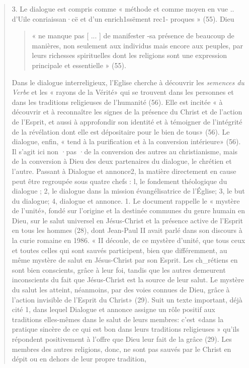 \begin{quote}
3. Le dialogue est compris comme « méthode et comme
moyen en vue .. d'Uile conriaissan·cë et d'un enrich1ssëment rec1-
proques » (55). Dieu 
\begin{quote}
    « ne manque pas [ ... ] de manifester -sa
présence de beaucoup de manières, non seulement aux individus
mais encore aux peuples, par leurs richesses spirituelles
dont les religions sont une expression principale et essentielle
» (55).
\end{quote}
 Dans le dialogue interreligieux, l'Eglise cherche
à découvrir les \textit{ semences du Verbe} et les « rayons de la
Vérité» qui se trouvent dans les personnes et dans les traditions
religieuses de l'humanité (56). Elle est incitée « à découvrir
et à reconnaître les signes de la présence du Christ et de
l'action de l'Esprit, et aussi à approfondir son identité et à
témoigner de l'intégrité de la révélation dont elle est dépositaire
pour le bien de tous» (56). Le dialogue, enfin, « tend à la
purification et à la conversion intérieure» (56). Il s'agit ici non
·pas ·de la conversion des autres au christianisme, mais de la
conversion à Dieu des deux partenaires du dialogue, le chrétien
et l'autre.
Passant à Dialogue et annonce2, la matière directement en
cause peut être regroupée sous quatre chefs : l, le fondement 
théologique du dialogue ; 2, le dialogue dans la mission évangélisatrice
de l'Église; 3, le but du dialogue; 4, dialogue et
annonce.
1. Le document rappelle le « mystère de l'unité», fondé sur
l'origine et la destinée communes du genre humain en Dieu,
sur le salut universel en Jésus-Christ et la présence active de
l'Esprit en tous les hommes (28), dont Jean-Paul II avait parlé
dans son discours à la curie romaine en 1986. « II découle, de
ce mystère d'unité, que tous ceux et toutes celles qui sont sauvés
participent, bien que différemment, au même mystère de
salut en Jésus-Christ par son Esprit. Les ch_rétiens en sont bien
conscients, grâce à leur foi, tandis que les autres demeurent
inconscients du fait que Jésus-Christ est la source de leur salut.
Le mystère du salut les atteint, néanmoins, par des voies
connues de Dieu, grâce à l'action invisible de l'Esprit du
Christ» (29). Suit un texte important, déjà cité 1, dans lequel
Dialogue et annonce assigne un rôle positif aux traditions
elles-mêmes dans le salut de leurs membres: c'est «dans la
pratique sincère de ce qui est bon dans leurs traditions religieuses
» qu'ils répondent positivement à l'offre que Dieu leur
fait de la grâce (29).
Les membres des autres religions, donc, ne sont pas sauvés
par le Christ en dépit ou en dehors de leur propre tradition,

\end{quote}
